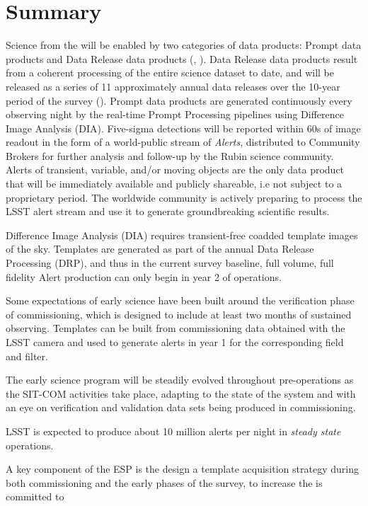 \section{Summary}

Science from the \rolsst will be enabled by two categories of data products: Prompt data products and Data Release data products (\citep{LPM-231}, \citep{LSE-163}). 
Data Release data products result from a coherent processing of the entire science dataset to date, and will be released as a series of 11 approximately annual data releases over the 10-year period of the survey (\citep{RDO-011}).
Prompt data products are generated continuously every observing night by the real-time Prompt Processing pipelines using Difference Image Analysis (DIA). 
Five-sigma detections will be reported within 60s of image readout in the form of a world-public stream of {\it Alerts}, distributed to Community Brokers for further analysis and follow-up by the Rubin science community.  
Alerts of transient, variable, and/or moving objects are the only data product that will be immediately available and publicly shareable, i.e not subject to a proprietary period.
The worldwide community is actively preparing to process the LSST alert stream and use it to generate groundbreaking scientific results. 
 
Difference Image Analysis (DIA) requires transient-free coadded template images of the sky.
Templates are generated as part of the annual Data Release Processing (DRP), and thus in the current survey baseline, full volume, full fidelity Alert production can only begin in year 2 of operations. 

Some expectations of early science have been built around the verification phase of commissioning,  which is designed to include at least two months of sustained observing. 
Templates can be built from commissioning data obtained with the LSST camera and used to generate alerts in year 1 for the corresponding field and filter. 



The early science program will be steadily evolved throughout pre-operations as the SIT-COM activities take place, adapting to the state of the system and with an eye on verification and validation data sets being produced in commissioning.

LSST is expected to produce about 10 million alerts per night in {\it steady state} operations. 

A key component of the ESP is the design a template acquisition strategy during both commissioning and the early phases of the survey, to increase the 
is committed to	

